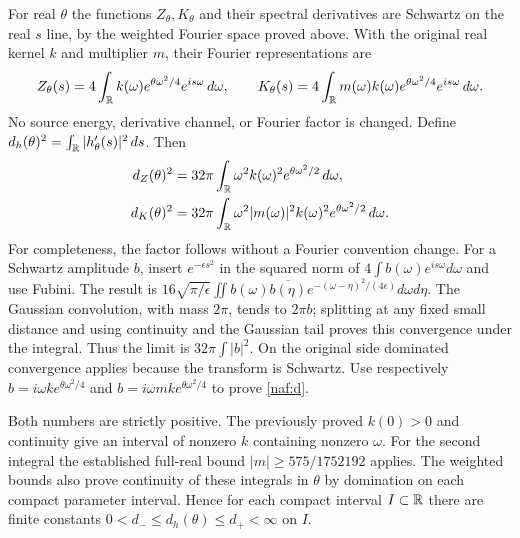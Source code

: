 For real $\theta$ the functions $Z_\theta,K_\theta$ and their spectral
derivatives are Schwartz on the real $s$ line, by the weighted Fourier
space proved above. With the original real kernel $k$ and multiplier
$m$, their Fourier representations are
\[
 Z_\theta(s)=4\int_\mathbb R k(\omega)e^{\theta\omega^2/4}e^{is\omega}\,d\omega,
 \qquad
 K_\theta(s)=4\int_\mathbb R m(\omega)k(\omega)e^{\theta\omega^2/4}
                                          e^{is\omega}\,d\omega.
\]
No source energy, derivative channel, or Fourier factor is changed.
Define $d_h(\theta)^2=\int_\mathbb R|h_\theta'(s)|^2\,ds$. Then
\begin{align}
 d_Z(\theta)^2&=32\pi\int_\mathbb R
                   \omega^2 k(\omega)^2e^{\theta\omega^2/2}\,d\omega,\notag\\
 d_K(\theta)^2&=32\pi\int_\mathbb R
        \omega^2|m(\omega)|^2 k(\omega)^2e^{\theta\omega^2/2}\,d\omega.
 \label{naf:d}
\end{align}
For completeness, the factor follows without a Fourier convention
change. For a Schwartz amplitude $b$, insert $e^{-\epsilon s^2}$ in
the squared norm of $4\int b(\omega)e^{is\omega}d\omega$ and use Fubini.
The result is
$16\sqrt{\pi/\epsilon}\iint b(\omega)\overline{b(\eta)}
e^{-(\omega-\eta)^2/(4\epsilon)}d\omega d\eta$.
The Gaussian convolution, with mass $2\pi$, tends to $2\pi b$;
splitting at any fixed small distance and using continuity and the
Gaussian tail proves this convergence under the integral. Thus the
limit is $32\pi\int|b|^2$. On the original side dominated convergence
applies because the transform is Schwartz. Use respectively
$b=i\omega k e^{\theta\omega^2/4}$ and
$b=i\omega m k e^{\theta\omega^2/4}$ to prove \eqref{naf:d}.

Both numbers are strictly positive. The previously proved $k(0)>0$
and continuity give an interval of nonzero $k$ containing nonzero
$\omega$. For the second integral the established full-real bound
$|m|\geq575/1752192$ applies. The weighted bounds also prove continuity
of these integrals in $\theta$ by domination on each compact parameter
interval. Hence for each compact interval $I\subset\mathbb R$ there are
finite constants $0<d_-\leq d_h(\theta)\leq d_+<\infty$ on $I$.

